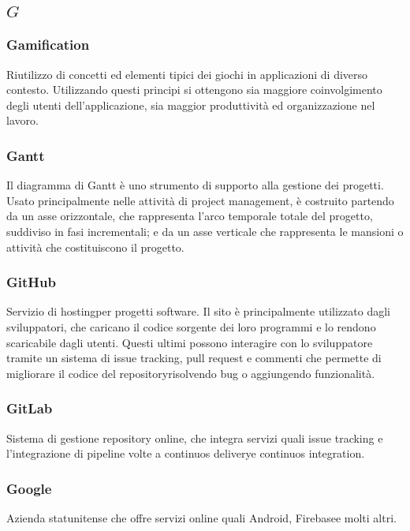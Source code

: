 \subsection*{\quad$G\quad$}
\subsubsection*{Gamification}
Riutilizzo di concetti ed elementi tipici dei giochi in applicazioni di diverso contesto. Utilizzando questi principi si ottengono sia maggiore coinvolgimento degli utenti dell'applicazione, sia maggior produttività ed organizzazione nel lavoro.

\subsubsection*{Gantt}
Il diagramma di Gantt è uno strumento di supporto alla gestione dei progetti. Usato principalmente nelle attività di project management, è costruito partendo da un asse orizzontale, che rappresenta l'arco temporale totale del progetto, suddiviso in fasi incrementali; e da un asse
verticale che rappresenta le mansioni o attività che costituiscono il progetto.

\subsubsection*{GitHub}
Servizio di hosting\glosp per progetti software. Il sito è principalmente utilizzato dagli sviluppatori, che caricano il codice sorgente dei loro programmi e lo rendono scaricabile dagli utenti. Questi ultimi possono interagire con lo sviluppatore tramite un sistema di issue tracking, pull request e commenti che permette di migliorare il codice del repository\glosp risolvendo bug o aggiungendo funzionalità.

\subsubsection*{GitLab}
Sistema di gestione repository online, che integra servizi quali issue tracking e l’integrazione di pipeline volte a continuos delivery\glosp e continuos integration\glo.

\subsubsection*{Google}
Azienda statunitense che offre servizi online quali Android\glosp, Firebase\glosp e molti altri.

